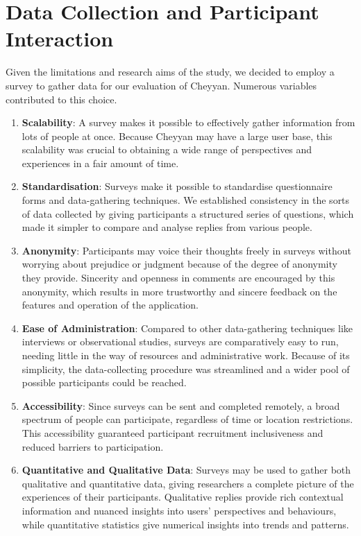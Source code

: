 \documentclass{l4proj}
\begin{document}
\section{Data Collection and Participant Interaction}
Given the limitations and research aims of the study, we decided to employ a survey to gather data for our evaluation of Cheyyan. Numerous variables contributed to this choice.

\begin{enumerate}
  
  \item \textbf{Scalability}: A survey makes it possible to effectively gather information from lots of people at once. Because Cheyyan may have a large user base, this scalability was crucial to obtaining a wide range of perspectives and experiences in a fair amount of time.
  
  \item \textbf{Standardisation}: Surveys make it possible to standardise questionnaire forms and data-gathering techniques. We established consistency in the sorts of data collected by giving participants a structured series of questions, which made it simpler to compare and analyse replies from various people.
  
\item \textbf{Anonymity}: Participants may voice their thoughts freely in surveys without worrying about prejudice or judgment because of the degree of anonymity they provide. Sincerity and openness in comments are encouraged by this anonymity, which results in more trustworthy and sincere feedback on the features and operation of the application.
  
  \item \textbf{Ease of Administration}: Compared to other data-gathering techniques like interviews or observational studies, surveys are comparatively easy to run, needing little in the way of resources and administrative work. Because of its simplicity, the data-collecting procedure was streamlined and a wider pool of possible participants could be reached.
  
  \item \textbf{Accessibility}: Since surveys can be sent and completed remotely, a broad spectrum of people can participate, regardless of time or location restrictions. This accessibility guaranteed participant recruitment inclusiveness and reduced barriers to participation.
  
  \item \textbf{Quantitative and Qualitative Data}: Surveys may be used to gather both qualitative and quantitative data, giving researchers a complete picture of the experiences of their participants. Qualitative replies provide rich contextual information and nuanced insights into users' perspectives and behaviours, while quantitative statistics give numerical insights into trends and patterns.
\end{enumerate}
\end{document}
